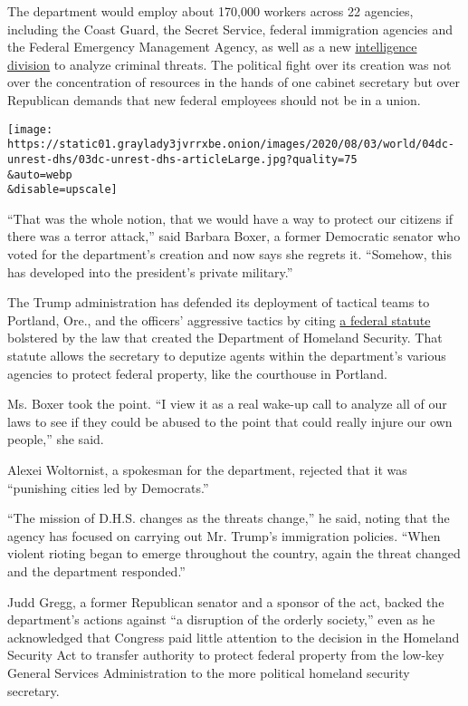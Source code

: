 The department would employ about 170,000 workers across 22 agencies,
including the Coast Guard, the Secret Service, federal immigration
agencies and the Federal Emergency Management Agency, as well as a new
\href{https://www.nytimes3xbfgragh.onion/2020/08/01/us/politics/brian-murphy-homeland-security-protesters.html}{intelligence
division} to analyze criminal threats. The political fight over its
creation was not over the concentration of resources in the hands of one
cabinet secretary but over Republican demands that new federal employees
should not be in a union.

\texttt{[image: https://static01.graylady3jvrrxbe.onion/images/2020/08/03/world/04dc-unrest-dhs/03dc-unrest-dhs-articleLarge.jpg?quality=75\\\&auto=webp\\\&disable=upscale]}

``That was the whole notion, that we would have a way to protect our
citizens if there was a terror attack,'' said Barbara Boxer, a former
Democratic senator who voted for the department's creation and now says
she regrets it. ``Somehow, this has developed into the president's
private military.''

The Trump administration has defended its deployment of tactical teams
to Portland, Ore., and the officers' aggressive tactics by citing
\href{https://www.law.cornell.edu/uscode/text/40/1315}{a federal
statute} bolstered by the law that created the Department of Homeland
Security. That statute allows the secretary to deputize agents within
the department's various agencies to protect federal property, like the
courthouse in Portland.

Ms. Boxer took the point. ``I view it as a real wake-up call to analyze
all of our laws to see if they could be abused to the point that could
really injure our own people,'' she said.

Alexei Woltornist, a spokesman for the department, rejected that it was
``punishing cities led by Democrats.''

``The mission of D.H.S. changes as the threats change,'' he said, noting
that the agency has focused on carrying out Mr. Trump's immigration
policies. ``When violent rioting began to emerge throughout the country,
again the threat changed and the department responded.''

Judd Gregg, a former Republican senator and a sponsor of the act, backed
the department's actions against ``a disruption of the orderly
society,'' even as he acknowledged that Congress paid little attention
to the decision in the Homeland Security Act to transfer authority to
protect federal property from the low-key General Services
Administration to the more political homeland security secretary.


